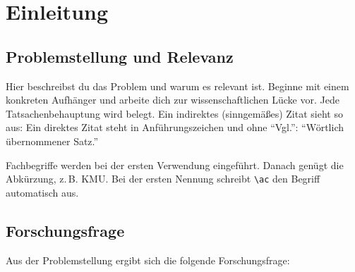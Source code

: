 \section{Einleitung}
\label{sec:einleitung}

\subsection{Problemstellung und Relevanz}
\label{subsec:problemstellung}

Hier beschreibst du das Problem und warum es relevant ist. Beginne mit einem
konkreten Aufhänger und arbeite dich zur wissenschaftlichen Lücke vor. Jede
Tatsachenbehauptung wird belegt. Ein indirektes (sinngemäßes) Zitat sieht so
aus:\autocite[Vgl.][S.~15]{mustermann2024}
Ein direktes Zitat steht in Anführungszeichen und ohne \enquote{Vgl.}:
\enquote{Wörtlich übernommener Satz.}\autocite[][S.~16]{mustermann2024}

Fachbegriffe werden bei der ersten Verwendung eingeführt. Danach genügt die
Abkürzung, z.\,B. \ac{KMU}. Bei der ersten Nennung schreibt \verb|\ac| den
Begriff automatisch aus.

\subsection{Forschungsfrage}
\label{subsec:forschungsfrage}

Aus der Problemstellung ergibt sich die folgende Forschungsfrage:

